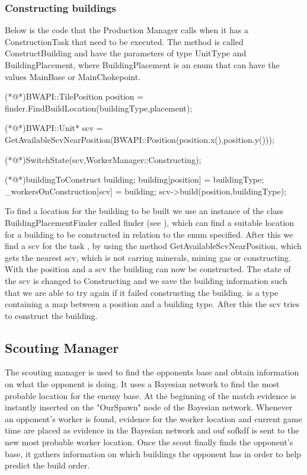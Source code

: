 		\subsubsection*{Constructing buildings}
			Below is the code that the Production Manager calls when it has a ConstructionTask that need to be executed. The method is called 
			ConstructBuilding and have the parameters of type UnitType and BuildingPlacement, where BuildingPlacement 
			is an enum that can have the values MainBase or MainChokepoint.
			\begin{Sourcecode}[caption=ConstructBuilding method]		
	(*@\lnote@*)BWAPI::TilePosition position = finder.FindBuildLocation(buildingType,placement);

	(*@\lnote@*)BWAPI::Unit* scv = GetAvailableScvNearPosition(BWAPI::Position(position.x(),position.y()));
	

	(*@\lnote@*)SwitchState(scv,WorkerManager::Constructing);
	
	(*@\lnote@*)buildingToConstruct building;	
	building[position] = buildingType;
	_workersOnConstruction[scv] = building;
	scv->build(position,buildingType);
			\end{Sourcecode}
			
			To find a location for the building to be built we use an instance of the class BuildingPlacementFinder called finder (see ), 
			which can find a suitable location for a building to be constructed in relation to the enum specified. After this we find a scv for the 
			task , by using the method GetAvailableScvNearPosition, which gets the nearest scv, which is not carring minerals, mining gas or 
			constructing. With the position and a scv the building can now be constructed. The state of the scv is changed to Constructing  and 
			we save the building information such that we are able to try again if it failed constructing the building.  is a type containing 
			a map between a position and a building type. After this the scv tries to 
			construct the building.
	\subsection{Scouting Manager}
	The scouting manager is used to find the opponents base and obtain information on what the opponent is doing. It uses a Bayesian network to find the most probable location for the enemy base. At the beginning of the match evidence is instantly inserted on the "OurSpawn" node of the Bayesian network. Whenever an opponent's worker is found, evidence for the worker location and current game time are placed as evidence in the Bayesian network and ouf sofkdf is sent to the new most probable worker location. Once the scout finally finds the opponent's base, it gathers information on which buildings the opponent has in order to help predict the build order.
